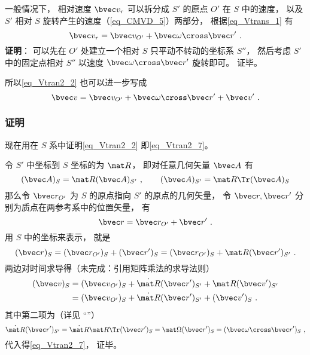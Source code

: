 一般情况下， 相对速度 $\bvec v_r$ 可以拆分成 $S'$ 的原点 $O'$ 在 $S$ 中的速度， 以及 $S'$ 相对 $S$ 旋转产生的速度（\autoref{eq_CMVD_5}）两部分， 根据\autoref{eq_Vtrans_1}  有
\begin{equation}\label{eq_Vtran2_4}
\bvec v_r = \bvec v_{O'} + \bvec \omega \cross \bvec r'~.
\end{equation}
\textbf{证明}： 可以先在 $O'$ 处建立一个相对 $S$ 只平动不转动的坐标系 $S''$， 然后考虑 $S'$ 中的固定点相对 $S''$ 以速度 $\bvec \omega \cross \bvec r'$ 旋转即可。 证毕。

所以\autoref{eq_Vtran2_2} 也可以进一步写成
\begin{equation}\label{eq_Vtran2_7}
\bvec v = \bvec v_{O'} + \bvec \omega \cross \bvec r' + \bvec v'~.
\end{equation}

\subsubsection{证明}
现在用在 $S$ 系中证明\autoref{eq_Vtran2_2} 即\autoref{eq_Vtran2_7}。

令 $S'$ 中坐标到 $S$ 坐标的为 $\mat R$， 即对任意几何矢量 $\bvec A$ 有
\begin{equation}
(\bvec A)_S = \mat R (\bvec A)_{S'}~, \qquad
(\bvec A)_{S'} = \mat R\Tr (\bvec A)_S
\end{equation}
那么令 $\bvec r_{O'}$ 为 $S$ 的原点指向 $S'$ 的原点的几何矢量， 令 $\bvec r, \bvec r'$ 分别为质点在两参考系中的位置矢量， 有
\begin{equation}
\bvec r = \bvec r_{O'} + \bvec r'~.
\end{equation}
用 $S$ 中的坐标来表示， 就是
\begin{equation}
(\bvec r)_S = (\bvec r_{O'})_S + (\bvec r')_S = (\bvec r_{O'})_S + \mat R(\bvec r')_{S'}~.
\end{equation}
两边对时间求导得（未完成：引用矩阵乘法的求导法则）
\begin{equation}
\begin{aligned}
(\bvec v)_S &= ({\bvec v}_{O'})_S + \dot{\mat R}(\bvec r')_{S'} + \mat R (\bvec v')_{S'}\\
&= ({\bvec v}_{O'})_S + \dot{\mat R}(\bvec r')_{S'} + (\bvec v')_S~.
\end{aligned}
\end{equation}
其中第二项为（详见 “”）
\begin{equation}
\dot{\mat R}(\bvec r')_{S'} = \dot{\mat R}\mat R\Tr (\bvec r')_S = \mat \Omega (\bvec r')_S = (\bvec \omega \cross \bvec r')_S~,
\end{equation}
代入得\autoref{eq_Vtran2_7}， 证毕。
